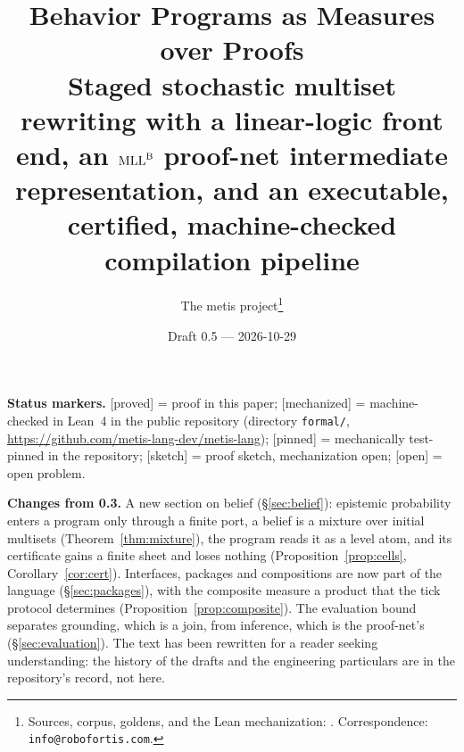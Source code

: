 \documentclass[11pt]{article}
\title{\textbf{Behavior Programs as Measures over Proofs}\\[1ex]
\large Staged stochastic multiset rewriting with a linear-logic front end,
an $\mathrm{MLL}^{\mathrm B}$ proof-net intermediate representation, and an executable,
certified, machine-checked compilation pipeline}
\author{The metis project\thanks{Sources, corpus, goldens, and the Lean
mechanization: \repourl. Correspondence: \texttt{info@robofortis.com}.}}
\date{Draft 0.5 --- 2026-10-29}
\newcommand{\repourl}{\url{https://github.com/metis-lang-dev/metis-lang}}
\newcommand{\stproved}{[\textsf{proved}]}
\newcommand{\stmech}{[\textsf{mechanized}]}
\newcommand{\stpinned}{[\textsf{pinned}]}
\newcommand{\stsketch}{[\textsf{sketch}]}
\newcommand{\stopen}{[\textsf{open}]}
\theoremstyle{plain}
\theoremstyle{definition}
\theoremstyle{remark}
\begin{document}
\maketitle

\begingroup\small\noindent
\textbf{Status markers.} \stproved{} = proof in this paper;
\stmech{} = machine-checked in Lean~4 in the public repository
(directory \texttt{formal/}, \repourl); \stpinned{} = mechanically
test-pinned in the repository; \stsketch{} = proof sketch, mechanization
open; \stopen{} = open problem.

\medskip\noindent
\textbf{Changes from 0.3.} A new section on belief
(\S\ref{sec:belief}): epistemic probability enters a program only
through a finite port, a belief is a mixture over initial multisets
(Theorem~\ref{thm:mixture}), the program reads it as a level atom, and
its certificate gains a finite sheet and loses nothing
(Proposition~\ref{prop:cells}, Corollary~\ref{cor:cert}). Interfaces,
packages and compositions are now part of the language
(\S\ref{sec:packages}), with the composite measure a product that the
tick protocol determines (Proposition~\ref{prop:composite}). The
evaluation bound separates grounding, which is a join, from inference,
which is the proof-net's (\S\ref{sec:evaluation}). The text has been
rewritten for a reader seeking understanding: the history of the
drafts and the engineering particulars are in the repository's record,
not here.
\endgroup
\end{document}
